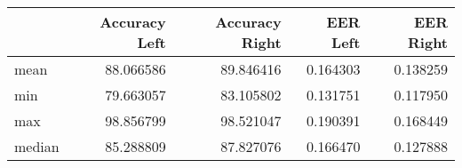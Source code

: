\begin{tabular}{lrrrr}
\toprule
{} &  Accuracy Left &  Accuracy Right &  EER Left &  EER Right \\
\midrule
mean   &      88.066586 &       89.846416 &  0.164303 &   0.138259 \\
min    &      79.663057 &       83.105802 &  0.131751 &   0.117950 \\
max    &      98.856799 &       98.521047 &  0.190391 &   0.168449 \\
median &      85.288809 &       87.827076 &  0.166470 &   0.127888 \\
\bottomrule
\end{tabular}

